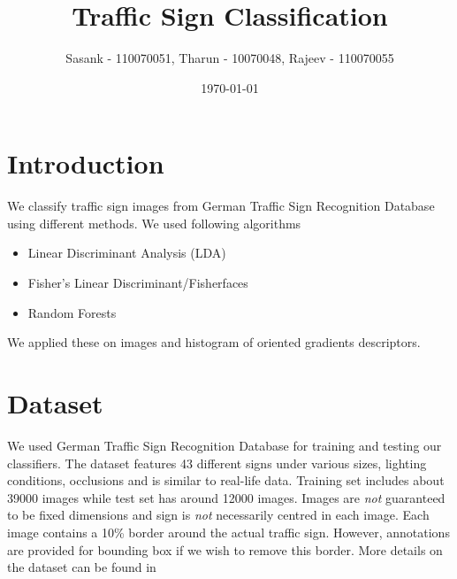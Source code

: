 \documentclass[a4paper]{article}
\begin{document}
\title{Traffic Sign Classification}
\author{Sasank - 110070051, Tharun - 10070048, Rajeev - 110070055}
\date{\today}
\maketitle

\section{Introduction}
We classify traffic sign images from German Traffic Sign Recognition Database using different methods. We used following algorithms
\begin{itemize}
\item Linear Discriminant Analysis (LDA)
\item Fisher's Linear Discriminant/Fisherfaces
\item Random Forests
\end{itemize}
We applied these on images and histogram of oriented gradients descriptors.

\section{Dataset}
We used German Traffic Sign Recognition Database for training and testing our classifiers. The dataset features 43 different signs under various sizes, lighting conditions, occlusions and is similar to real-life data.
Training set includes about 39000 images while test set has around 12000 images. Images are \emph{not} guaranteed to be fixed dimensions and sign is \emph{not} necessarily centred in each image. Each image contains a 10\% border around the actual traffic sign. However, annotations are provided for bounding box if we wish to remove this border. More details on the dataset can be found in \cite{dataset}
\end{document}
